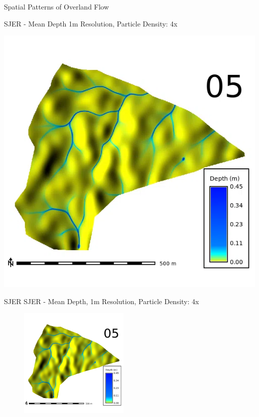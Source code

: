 \documentclass[
  ignorenonframetext,
]{beamer}
\begin{document}
\begin{frame}{Spatial Patterns of Overland Flow}
\label{spatial-patterns-of-overland-flow}
\begin{block}{SJER - Mean Depth}
\label{sjer---mean-depth}
1m Resolution, Particle Density: 4x

\includegraphics{../output/SJER/sensitivity_1/SJER_depth_1_4_s_average.webp}
\end{block}

\begin{block}{SJER}
\label{sjer}
SJER - Mean Depth, 1m Resolution, Particle Density: 4x

\begin{figure}[H]

{\centering \includegraphics[width=2.08333in,height=\textheight]{../output/SJER/sensitivity_1/SJER_depth_1_4_s_05_average.png}

}
\end{figure}
\end{block}
\end{frame}
\end{document}
